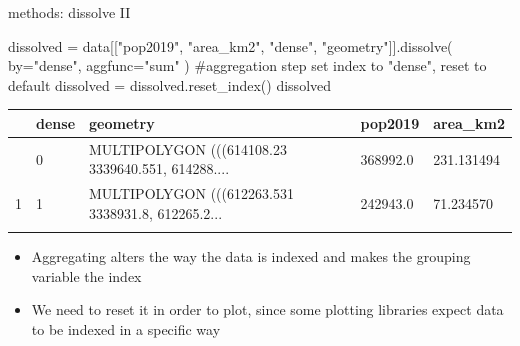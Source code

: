 \documentclass[
  ignorenonframetext,
]{beamer}
\newenvironment{Shaded}{\begin{snugshade}}{\end{snugshade}}
\newcommand{\CommentTok}[1]{\textcolor[rgb]{0.37,0.37,0.37}{#1}}
\newcommand{\NormalTok}[1]{\textcolor[rgb]{0.00,0.23,0.31}{#1}}
\newcommand{\OperatorTok}[1]{\textcolor[rgb]{0.37,0.37,0.37}{#1}}
\newcommand{\StringTok}[1]{\textcolor[rgb]{0.13,0.47,0.30}{#1}}
\providecommand{\tightlist}{%
  \setlength{\itemsep}{0pt}\setlength{\parskip}{0pt}}\usepackage{longtable,booktabs,array}
\begin{document}
\begin{frame}[fragile]{methods: dissolve II}
\label{methods-dissolve-ii}
\begin{Shaded}
\begin{Highlighting}[]
\NormalTok{dissolved }\OperatorTok{=}\NormalTok{ data[[}\StringTok{"pop2019"}\NormalTok{, }\StringTok{"area\_km2"}\NormalTok{, }\StringTok{"dense"}\NormalTok{, }\StringTok{"geometry"}\NormalTok{]].dissolve(}
\NormalTok{    by}\OperatorTok{=}\StringTok{"dense"}\NormalTok{, aggfunc}\OperatorTok{=}\StringTok{"sum"}
\NormalTok{)}
\CommentTok{\#aggregation step set index to "dense", reset to default}
\NormalTok{dissolved }\OperatorTok{=}\NormalTok{ dissolved.reset\_index()}
\NormalTok{dissolved}
\end{Highlighting}
\end{Shaded}

\begin{longtable}[]{@{}lllll@{}}
\toprule\noalign{}
& dense & geometry & pop2019 & area\_km2 \\
\midrule\noalign{}
\endhead
0 & 0 & MULTIPOLYGON (((614108.23 3339640.551, 614288.... & 368992.0 &
231.131494 \\
1 & 1 & MULTIPOLYGON (((612263.531 3338931.8, 612265.2... & 242943.0 &
71.234570 \\
\bottomrule\noalign{}
\end{longtable}

\begin{itemize}
\tightlist
\item
  Aggregating alters the way the data is indexed and makes the grouping
  variable the index
\item
  We need to reset it in order to plot, since some plotting libraries
  expect data to be indexed in a specific way
\end{itemize}
\end{frame}
\end{document}
